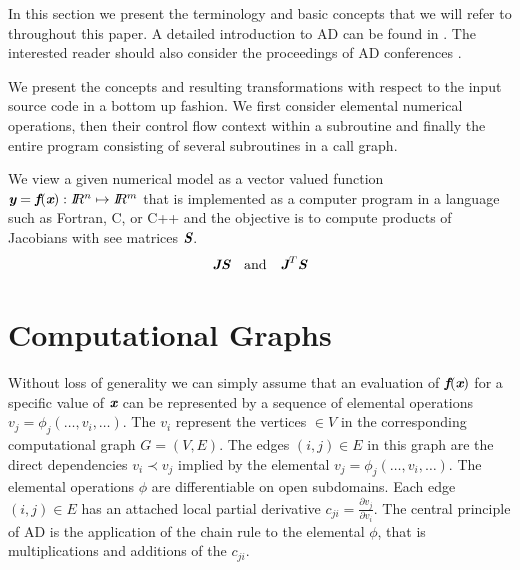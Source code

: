 \documentclass{book}
\newcommand{\R}{I\!\!R}
\newcommand{\bmf}{\mbox{\bf\em f}}
\newcommand{\bmJ}{\mbox{\bf\em J}}
\newcommand{\bmS}{\mbox{\bf\em S}}
\newcommand{\bmx}{\mbox{\bf\em x}}
\newcommand{\bmy}{\mbox{\bf\em y}}
\begin{document}
In this section we present the terminology and basic concepts that 
we will refer to throughout this paper. 
A detailed introduction to AD can be found in \cite{Griewank2008EDP}.
The interested reader should also consider the proceedings of AD 
conferences \cite{Griewank1991ADo,Berz1996CDT,Corliss2002ADo,Bucker2005ADA,Bischof2008AiA}.

We present the concepts and resulting transformations 
with respect to the input source code 
in a bottom up fashion.  
We first consider elemental numerical operations, 
then their control flow context within a subroutine and finally the entire program 
consisting of several subroutines in a call graph. 

We view a given numerical model as a 
vector valued function $\bmy=\bmf(\bmx): \R^n\mapsto \R^m$ that is implemented 
as a computer program in a language such as Fortran, C, or C++ and the objective is to  
compute products of Jacobians with see matrices $\bmS$.
\begin{equation}\label{eqn:JacVecProds}
\bmJ \bmS \quad \mbox{and} \quad \bmJ^T \bmS
\end{equation}
\section{Computational Graphs} \label{sec:computationalGraphs}

Without loss of generality we can simply assume that an evaluation of $\bmf(\bmx)$ for  
a specific value of $\bmx$ can be represented by a sequence of 
elemental operations $v_j=\phi_j(\ldots,v_i,\ldots)$. 
The $v_i$ represent the vertices $\in V$ in the corresponding computational 
graph $G=(V,E)$. The edges $(i,j)\in E$ in this graph are the direct dependencies 
$v_i\prec v_j$ implied by the elemental $v_j=\phi_j(\ldots,v_i,\ldots)$.
The elemental operations $\phi$ are differentiable on open subdomains. 
Each edge $(i,j)\in E$ has an attached local partial derivative 
$c_{ji}=\frac{\partial v_j}{\partial v_i}$. 
The central principle of AD is 
the application of the chain rule to the elemental $\phi$, that is 
multiplications and additions of the  $c_{ji}$.  
\end{document}

